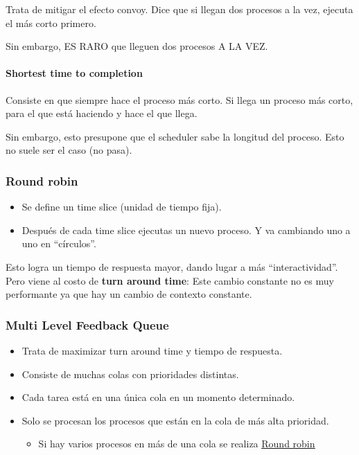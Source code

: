\documentclass{article}
\begin{document}
Trata de mitigar el efecto convoy. Dice que si llegan dos procesos a la
vez, ejecuta el más corto primero.

Sin embargo, ES RARO que lleguen dos procesos A LA VEZ.

\paragraph{Shortest time to
completion}\label{shortest-time-to-completion}

Consiste en que siempre hace el proceso más corto. Si llega un proceso
más corto, para el que está haciendo y hace el que llega.

Sin embargo, esto presupone que el scheduler sabe la longitud del
proceso. Esto no suele ser el caso (no pasa).

\subsubsection{Round robin}\label{round-robin}

\begin{itemize}
\item
  Se define un time slice (unidad de tiempo fija).
\item
  Después de cada time slice ejecutas un nuevo proceso. Y va cambiando
  uno a uno en ``círculos''.
\end{itemize}

Esto logra un tiempo de respuesta mayor, dando lugar a más
``interactividad''. Pero viene al costo de \textbf{turn around time}:
Este cambio constante no es muy performante ya que hay un cambio de
contexto constante.

\subsubsection{Multi Level Feedback
Queue}\label{multi-level-feedback-queue}

\begin{itemize}
\item
  Trata de maximizar turn around time y tiempo de respuesta.
\item
  Consiste de muchas colas con prioridades distintas.
\item
  Cada tarea está en una única cola en un momento determinado.
\item
  Solo se procesan los procesos que están en la cola de más alta
  prioridad.

  \begin{itemize}
  \item
    Si hay varios procesos en más de una cola se realiza
    \hyperref[round-robin]{\underline{Round robin}}
  \end{itemize}
\end{itemize}
\end{document}
